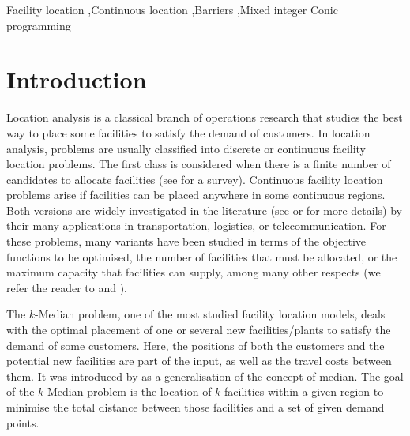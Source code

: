 \documentclass[a4paper,  review, authoryear, 1p.]{elsarticle}
\begin{document}
\begin{frontmatter}
		\begin{keyword}
			Facility location \sep Continuous location \sep Barriers \sep Mixed integer Conic programming 
		\end{keyword}
	\end{frontmatter}
	
	\section{Introduction}\label{section:introduction}

	Location analysis is a classical branch of operations research that studies the best way to place some facilities to satisfy the demand of customers. In location analysis, problems are usually classified into discrete or continuous facility location problems. The first class is considered when there is a finite number of candidates to allocate facilities (see \citet{ulukan2015} for a survey). Continuous facility location problems arise if facilities can be placed anywhere in some continuous regions. Both versions are widely investigated in the literature (see \citet{drezner2004} or \citet{nickel2007} for more details) by their many applications in transportation, logistics, or telecommunication. For these problems, many variants have been studied in terms of the objective functions to be optimised, the number of facilities that must be allocated, or the maximum capacity that facilities can supply, among many other respects (we refer the reader to \citet{kuehn1963} and \citet{puerto2008}).
	
	The $k$-Median problem, one of the most studied facility location models, deals with the optimal placement of one or several new facilities/plants to satisfy the demand of some customers. Here, the positions of both the customers and the potential new facilities are part of the input, as well as the travel costs between them. It was introduced by \cite{hakimi1965} as a generalisation of the concept of median. The goal of the $k$-Median problem is the location of $k$ facilities within a given region to minimise the total distance between those facilities and a set of given demand points.
	
\end{document}
